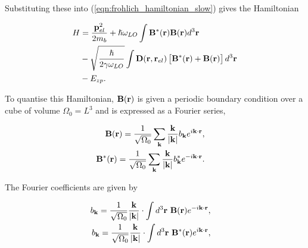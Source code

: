 Substituting these into (\ref{eqn:frohlich_hamiltonian_slow}) gives the Hamiltonian

\begin{equation}
\begin{aligned}
    H &= \frac{\vb{p}^2_{el}}{2m_b} + \hslash \omega_{LO} \int \vb{B}^*(\vb{r}) \vb{B}(\vb{r}) d^3\vb{r} \\
    &- \sqrt{\frac{\hslash}{2\gamma\omega_{LO}}} \int \vb{D}(\vb{r}, \vb{r}_{el}) \left[ \vb{B}^*(\vb{r}) + \vb{B}(\vb{r}) \right] d^3 \vb{r} \\
    &- E_{zp}.
\end{aligned}
\end{equation}

To quantise this Hamiltonian, $\vb{B}(\vb{r})$ is given a periodic boundary condition over a cube of volume $\Omega_0 = L^3$ and is expressed as a Fourier series,

\begin{subequations}
\begin{align}
    \begin{split}
        \vb{B}(\vb{r}) &= \frac{1}{\sqrt{\Omega_0}} \sum_{\vb{k}} \frac{\vb{k}}{\abs{\vb{k}}} b_{\vb{k}} e^{i \vb{k} \cdot \vb{r}},
    \end{split}\\
    \begin{split}
        \vb{B}^*(\vb{r}) &= \frac{1}{\sqrt{\Omega_0}} \sum_{\vb{k}} \frac{\vb{k}}{\abs{\vb{k}}} b^*_{\vb{k}} e^{-i \vb{k} \cdot \vb{r}}.
    \end{split}
\end{align}
\end{subequations}

The Fourier coefficients are given by

\begin{subequations}
\begin{align}
    \begin{split}
        b_{\vb{k}} &= \frac{1}{\sqrt{\Omega_0}} \frac{\vb{k}}{\abs{\vb{k}}} \cdot \int d^3\vb{r}\  \vb{B}(\vb{r}) e^{-i \vb{k} \cdot \vb{r}},
    \end{split}\\
    \begin{split}
        b_{\vb{k}} &= \frac{1}{\sqrt{\Omega_0}} \frac{\vb{k}}{\abs{\vb{k}}} \cdot \int d^3\vb{r}\  \vb{B}^*(\vb{r}) e^{i \vb{k} \cdot \vb{r}},
    \end{split}
\end{align}
\end{subequations}

